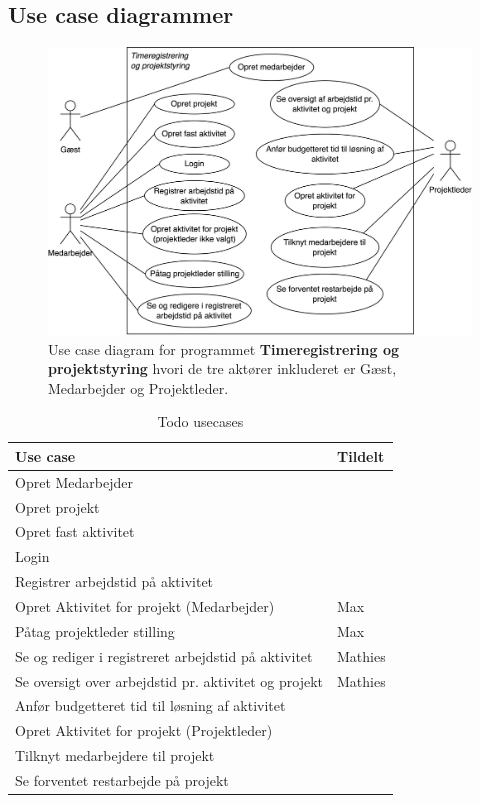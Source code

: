 \subsection{Use case diagrammer}
\begin{figure}[H]
    \centering
    \caption{Use case diagram for programmet \textbf{Timeregistrering og projektstyring} hvori de tre aktører inkluderet er Gæst, Medarbejder og Projektleder.}\label{fig:AlleActorsPaaEnGang}
    \includegraphics[width=.85\textwidth]{Diagrams/Timeregistrering og projektstyring.png}
\end{figure}
\begin{table}[H]
    \centering
    \caption{Todo usecases}
    \begin{tabular}{ll}
        Use case                                             & Tildelt \\
        \midrule
        Opret Medarbejder                                    &         \\
        Opret projekt                                        &         \\
        Opret fast aktivitet                                 &         \\
        Login                                                &         \\
        Registrer arbejdstid på aktivitet                    &         \\
        Opret Aktivitet for projekt (Medarbejder)            & Max     \\
        Påtag projektleder stilling                          & Max     \\
        Se og rediger i registreret arbejdstid på aktivitet  & Mathies \\
        Se oversigt over arbejdstid pr. aktivitet og projekt & Mathies \\
        Anfør budgetteret tid til løsning af aktivitet       &         \\
        Opret Aktivitet for projekt (Projektleder)           &         \\
        Tilknyt medarbejdere til projekt                     &         \\
        Se forventet restarbejde på projekt                  &         \\
    \end{tabular}
\end{table}


